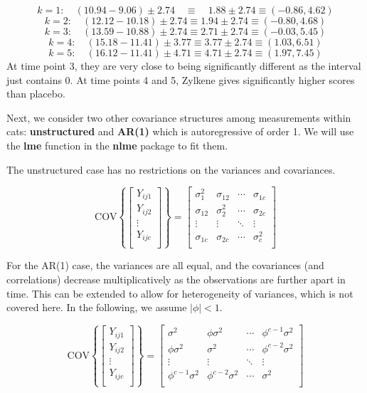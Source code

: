 \documentclass[
]{book}
\begin{document}
\[
k=1: \quad (10.94-9.06) \pm 2.74 \quad \equiv \quad 1.88\pm 2.74
\equiv (-0.86,4.62)
\] \[
k=2: \quad (12.12-10.18) \pm 2.74  \equiv  1.94\pm 2.74
\equiv (-0.80,4.68)
\] \[
k=3: \quad (13.59-10.88) \pm 2.74  \equiv  2.71\pm 2.74
\equiv (-0.03,5.45)
\] \[
k=4: \quad (15.18-11.41) \pm 3.77  \equiv  3.77\pm 2.74
\equiv (1.03,6.51)
\] \[
k=5: \quad (16.12-11.41) \pm 4.71  \equiv  4.71\pm 2.74
\equiv (1.97,7.45)
\] At time point 3, they are very close to being significantly different
as the interval just contains 0. At time points 4 and 5, Zylkene gives
significantly higher scores than placebo.

Next, we consider two other covariance structures among measurements
within cats: \textbf{unstructured} and \textbf{AR(1)} which is
autoregressive of order 1. We will use the \textbf{lme} function in the
\textbf{nlme} package to fit them.

The unstructured case has no restrictions on the variances and
covariances.

\[
\mbox{COV}\left\{
\begin{bmatrix}
Y_{ij1} \\ Y_{ij2} \\ \vdots \\Y_{ijc} \\
\end{bmatrix}
\right\}
= 
\begin{bmatrix}
\sigma_{1}^2   &
\sigma_{12}  &  \cdots &
\sigma_{1c} \\
\sigma_{12} & 
\sigma_2^2 &
\cdots & \sigma_{2c} \\
\vdots & \vdots & \ddots & \vdots \\
\sigma_{1c} & \sigma_{2c} & 
\cdots & \sigma_c^2\\
\end{bmatrix}
\]

For the AR(1) case, the variances are all equal, and the covariances
(and correlations) decrease multiplicatively as the observations are
further apart in time. This can be extended to allow for heterogeneity
of variances, which is not covered here. In the following, we assume
\(|\phi |<1\).

\[
\mbox{COV}\left\{
\begin{bmatrix}
Y_{ij1} \\ Y_{ij2} \\ \vdots \\Y_{ijc} \\
\end{bmatrix}
\right\}
= 
\begin{bmatrix}
\sigma^2 &
\phi\sigma^2  &  \cdots &
\phi^{c-1}\sigma^2 \\
\phi\sigma^2 & 
\sigma^2 &
\cdots & \phi^{c-2}\sigma^2 \\
\vdots & \vdots & \ddots & \vdots \\
\phi^{c-1}\sigma^2 & \phi^{c-2}\sigma^2 & 
\cdots & \sigma^2\\
\end{bmatrix}
\]
\end{document}
